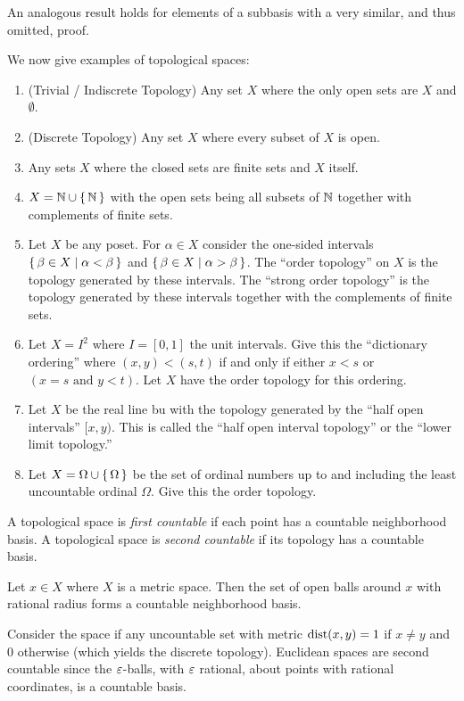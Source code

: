\documentclass[letterpaper, 11pt, oneside]{book}
\begin{document}
An analogous result holds for elements of a subbasis with a very similar, and thus omitted, proof.

\begin{ex}
  We now give examples of topological spaces:
  \begin{enumerate}
  \item (Trivial / Indiscrete Topology) Any set $X$ where the only open sets are $X$ and $\emptyset$.
  \item (Discrete Topology) Any set $X$ where every subset of $X$ is open.
  \item Any sets $X$ where the closed sets are finite sets and $X$ itself.
  \item $X = \mathbb{N} \cup \set{\mathbb{N}}$ with the open sets being all subsets of $\mathbb{N}$ together with complements of finite sets.
  \item Let $X$ be any poset.
        For $\alpha \in X$ consider the one-sided intervals $\set{\beta \in X | \alpha < \beta}$ and $\set{\beta \in X | \alpha > \beta}$.
        The ``order topology'' on $X$ is the topology generated by these intervals.
        The ``strong order topology'' is the topology generated by these intervals together with the complements of finite sets.
  \item Let $X = I^{2}$ where $I = [0, 1]$ the unit intervals.
        Give this the ``dictionary ordering'' where $(x, y) < (s, t)$ if and only if either $x < s$ or $(x = s \text{ and } y < t)$.
        Let $X$ have the order topology for this ordering.
  \item Let $X$ be the real line bu with the topology generated by the ``half open intervals'' $[x, y)$.
        This is called the ``half open interval topology'' or the ``lower limit topology.''
  \item Let $X = \Omega \cup \set{\Omega}$ be the set of ordinal numbers up to and including the least uncountable ordinal $\Omega$.
        Give this the order topology.
  \end{enumerate}
\end{ex}

\begin{defn}[Countability]
  A topological space is \emph{first countable} if each point has a countable neighborhood basis.
  A topological space is \emph{second countable} if its topology has a countable basis.
\end{defn}

\clearpage

\begin{ex}
  Let $x \in X$ where $X$ is a metric space.
  Then the set of open balls around $x$ with rational radius forms a countable neighborhood basis.

  Consider the space if any uncountable set with metric $\operatorname{dist}(x, y) = 1$ if $x \neq y$ and $0$ otherwise (which yields the discrete topology).
  Euclidean spaces are second countable since the $\varepsilon$-balls, with $\varepsilon$ rational, about points with rational coordinates, is a countable basis.
\end{ex}
\end{document}
